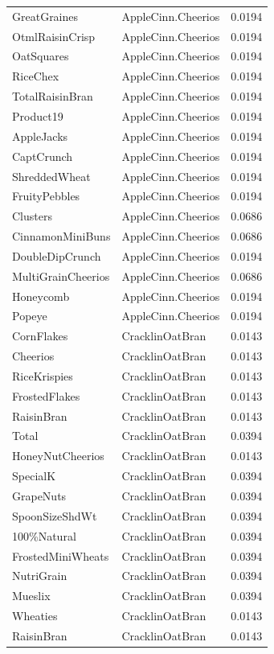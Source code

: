 \begin{longtable}{llr}
GreatGraines & AppleCinn.Cheerios & 0.0194 \\
OtmlRaisinCrisp & AppleCinn.Cheerios & 0.0194 \\
OatSquares & AppleCinn.Cheerios & 0.0194 \\
RiceChex & AppleCinn.Cheerios & 0.0194 \\
TotalRaisinBran & AppleCinn.Cheerios & 0.0194 \\
Product19 & AppleCinn.Cheerios & 0.0194 \\
AppleJacks & AppleCinn.Cheerios & 0.0194 \\
CaptCrunch & AppleCinn.Cheerios & 0.0194 \\
ShreddedWheat & AppleCinn.Cheerios & 0.0194 \\
FruityPebbles & AppleCinn.Cheerios & 0.0194 \\
Clusters & AppleCinn.Cheerios & 0.0686 \\
CinnamonMiniBuns & AppleCinn.Cheerios & 0.0686 \\
DoubleDipCrunch & AppleCinn.Cheerios & 0.0194 \\
MultiGrainCheerios & AppleCinn.Cheerios & 0.0686 \\
Honeycomb & AppleCinn.Cheerios & 0.0194 \\
Popeye & AppleCinn.Cheerios & 0.0194 \\
CornFlakes & CracklinOatBran & 0.0143 \\
Cheerios & CracklinOatBran & 0.0143 \\
RiceKrispies & CracklinOatBran & 0.0143 \\
FrostedFlakes & CracklinOatBran & 0.0143 \\
RaisinBran & CracklinOatBran & 0.0143 \\
Total & CracklinOatBran & 0.0394 \\
HoneyNutCheerios & CracklinOatBran & 0.0143 \\
SpecialK & CracklinOatBran & 0.0394 \\
GrapeNuts & CracklinOatBran & 0.0394 \\
SpoonSizeShdWt & CracklinOatBran & 0.0394 \\
100\%Natural & CracklinOatBran & 0.0394 \\
FrostedMiniWheats & CracklinOatBran & 0.0394 \\
NutriGrain & CracklinOatBran & 0.0394 \\
Mueslix & CracklinOatBran & 0.0394 \\
Wheaties & CracklinOatBran & 0.0143 \\
RaisinBran & CracklinOatBran & 0.0143 \\

\end{longtable}
